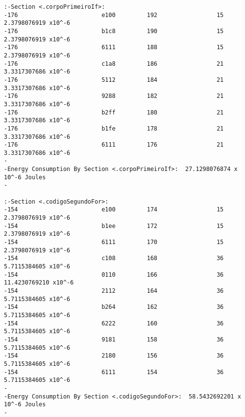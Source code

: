\begin{verbatim}
:-Section <.corpoPrimeiroIf>:  
-176                        e100         192                 15              2.3798076919 x10^-6 
-176                        b1c8         190                 15              2.3798076919 x10^-6 
-176                        6111         188                 15              2.3798076919 x10^-6 
-176                        c1a8         186                 21              3.3317307686 x10^-6 
-176                        5112         184                 21              3.3317307686 x10^-6 
-176                        9288         182                 21              3.3317307686 x10^-6 
-176                        b2ff         180                 21              3.3317307686 x10^-6 
-176                        b1fe         178                 21              3.3317307686 x10^-6 
-176                        6111         176                 21              3.3317307686 x10^-6 
-                                                                                          
-Energy Consumption By Section <.corpoPrimeiroIf>:  27.1298076874 x 10^-6 Joules
-                                                                                          

:-Section <.codigoSegundoFor>:  
-154                        e100         174                 15              2.3798076919 x10^-6 
-154                        b1ee         172                 15              2.3798076919 x10^-6 
-154                        6111         170                 15              2.3798076919 x10^-6 
-154                        c108         168                 36              5.7115384605 x10^-6 
-154                        0110         166                 36              11.4230769210 x10^-6 
-154                        2112         164                 36              5.7115384605 x10^-6 
-154                        b264         162                 36              5.7115384605 x10^-6 
-154                        6222         160                 36              5.7115384605 x10^-6 
-154                        9181         158                 36              5.7115384605 x10^-6 
-154                        2180         156                 36              5.7115384605 x10^-6 
-154                        6111         154                 36              5.7115384605 x10^-6 
-                                                                                          
-Energy Consumption By Section <.codigoSegundoFor>:  58.5432692201 x 10^-6 Joules
-                                                                                          


\end{verbatim}
